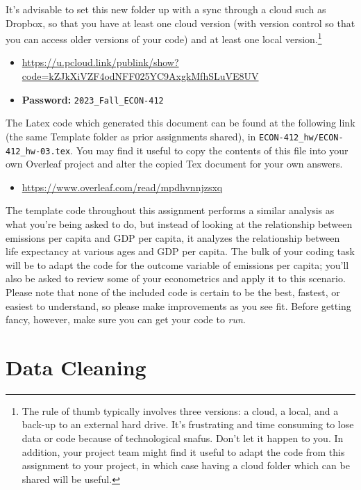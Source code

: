 It's advisable to set this new folder up with a sync through a cloud such as Dropbox, so that you have at least one cloud version (with version control so that you can access older versions of your code) and at least one local version.\footnote{The rule of thumb typically involves three versions: a cloud, a local, and a back-up to an external hard drive. It's frustrating and time consuming to lose data or code because of technological snafus. Don't let it happen to you. In addition, your project team might find it useful to adapt the code from this assignment to your project, in which case having a cloud folder which can be shared will be useful.}


\begin{itemize}
    \item \href{https://u.pcloud.link/publink/show?code=kZJkXiVZF4odNFF025YC9AxgkMfhSLuVE8UV}{https://u.pcloud.link/publink/show?code=kZJkXiVZF4odNFF025YC9AxgkMfhSLuVE8UV}
    \item \textbf{Password:} \verb+2023_Fall_ECON-412+
\end{itemize}

The Latex code which generated this document can be found at the following link (the same Template folder as prior assignments shared), in \verb+ECON-412_hw/ECON-412_hw-03.tex+. You may find it useful to copy the contents of this file into your own Overleaf project and alter the copied Tex document for your own answers.

\begin{itemize}
    \item \href{https://www.overleaf.com/read/mpdhvnnjzsxq}{https://www.overleaf.com/read/mpdhvnnjzsxq}
\end{itemize}
The template code throughout this assignment performs a similar analysis as what you're being asked to do, but instead of looking at the relationship between emissions per capita and GDP per capita, it analyzes the relationship between life expectancy at various ages and GDP per capita. The bulk of your coding task will be to adapt the code for the outcome variable of emissions per capita; you'll also be asked to review some of your econometrics and apply it to this scenario. Please note that none of the included code is certain to be the best, fastest, or easiest to understand, so please make improvements as you see fit. Before getting fancy, however, make sure you can get your code to \textit{run}.

\section{Data Cleaning}


